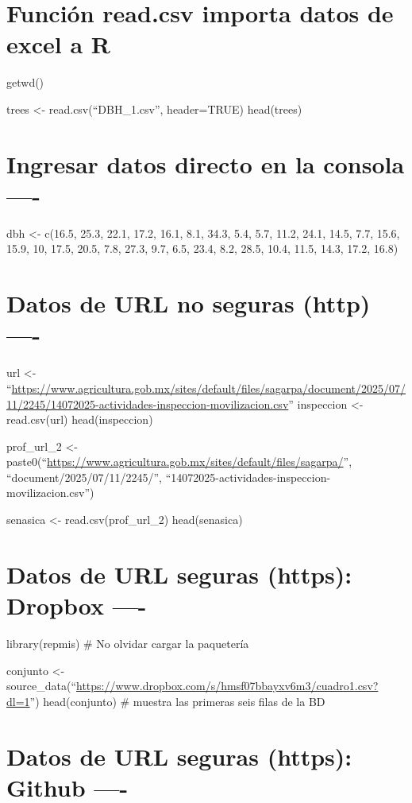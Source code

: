\documentclass[
]{article}
\begin{document}
\section{Función read.csv importa datos de excel a
R}\label{funciuxf3n-read.csv-importa-datos-de-excel-a-r}

getwd()

trees \textless- read.csv(``DBH\_1.csv'', header=TRUE) head(trees)

\section{Ingresar datos directo en la consola
----}\label{ingresar-datos-directo-en-la-consola--}

dbh \textless- c(16.5, 25.3, 22.1, 17.2, 16.1, 8.1, 34.3, 5.4, 5.7,
11.2, 24.1, 14.5, 7.7, 15.6, 15.9, 10, 17.5, 20.5, 7.8, 27.3, 9.7, 6.5,
23.4, 8.2, 28.5, 10.4, 11.5, 14.3, 17.2, 16.8)

\section{Datos de URL no seguras (http)
----}\label{datos-de-url-no-seguras-http--}

url \textless-
``\url{https://www.agricultura.gob.mx/sites/default/files/sagarpa/document/2025/07/11/2245/14072025-actividades-inspeccion-movilizacion.csv}''
inspeccion \textless- read.csv(url) head(inspeccion)

prof\_url\_2 \textless-
paste0(``\url{https://www.agricultura.gob.mx/sites/default/files/sagarpa/}'',
``document/2025/07/11/2245/'',
``14072025-actividades-inspeccion-movilizacion.csv'')

senasica \textless- read.csv(prof\_url\_2) head(senasica)

\section{Datos de URL seguras (https): Dropbox
----}\label{datos-de-url-seguras-https-dropbox--}

library(repmis) \# No olvidar cargar la paquetería

conjunto \textless-
source\_data(``\url{https://www.dropbox.com/s/hmsf07bbayxv6m3/cuadro1.csv?dl=1}'')
head(conjunto) \# muestra las primeras seis filas de la BD

\section{Datos de URL seguras (https): Github
----}\label{datos-de-url-seguras-https-github--}
\end{document}
